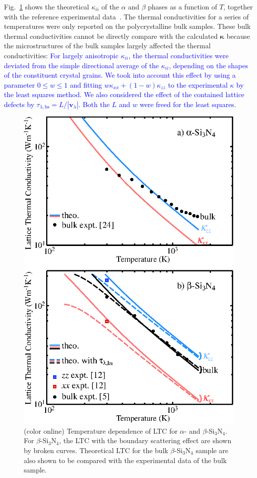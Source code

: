 \documentclass[twocolumn,amsmath,amssymb,a4paper,prb,superscriptaddress,floatfix]{revtex4-1}
\begin{document}
Fig.~\ref{fig:Fig1_338} shows the theoretical $\kappa_{ii}$ of the $\alpha$ and
$\beta$ phases as a function of $T$, together with the reference experimental
data~\cite{hirosaki,hirai,li}. The thermal conductivities for a series of
temperatures were only reported on the polycrystalline bulk samples.  These
bulk thermal conductivities cannot be directly compare with the calculated
$\boldsymbol{\kappa}$ because the microstructures of the bulk samples largely
affected the thermal conductivities:  \textcolor {blue} { For largely anisotropic
$\kappa_{ii}$, the thermal conductivities were deviated from the simple
directional average of the $\kappa_{ii}$, depending on the shapes
of the constituent crystal grains.  We took into account this effect by
using a parameter $0\le{w}\le{1}$ and fitting $w\kappa_{xx} + (1-w) \kappa_{zz}$ 
to the experimental $\kappa$ by the least squares method.
We also considered the effect of the contained lattice defects by
$\tau_{\lambda,\text{bs}}=L/|\mathbf{v}_\lambda|$. Both the $L$
and $w$ were freed for the least squares. }

\begin{figure}[ht]
 \begin{center}
  \includegraphics[width=0.90\linewidth]{Fig1_m1010.eps} \caption{(color
  online) Temperature dependence of LTC for $\alpha$-
  and $\beta$-Si$_3$N$_4$. For $\beta$-Si$_3$N$_4$, the LTC with the boundary scattering effect are
  shown by broken curves. Theoretical LTC for
  the bulk $\beta$-Si$_3$N$_4$ sample are also shown to be compared with
  the experimental data of the bulk sample.}
  \label{fig:Fig1_338}
 \end{center}
\end{figure}
\end{document}
